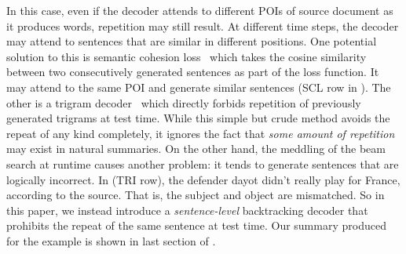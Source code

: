 In this case, even if the decoder attends to different POIs of 
source document as it produces words, repetition may still result.  
At different time steps, 
the decoder may attend 
to sentences that are similar in different positions.
One potential solution to this is semantic cohesion loss~\cite{elikyilmazBHC18}
which takes the cosine similarity between two consecutively generated sentences
as part of the loss function. It may attend to the same POI
and generate similar sentences (SCL row in ).  
The other is a trigram decoder~\cite{PaulusXS17} 
which directly forbids repetition of previously generated trigrams at test time. 
While this simple but crude method avoids the repeat of any kind
completely, 
it ignores the fact that \textit{some amount of repetition} may exist
in natural summaries.  
On the other hand, the meddling of the beam search at runtime causes another problem: 
it tends to generate sentences that are logically incorrect. 
In  (TRI row), the defender dayot didn't
really play for France, according to the source.
That is, the subject and object are mismatched.
So in this paper, we instead introduce a {\em sentence-level} backtracking decoder
that prohibits the repeat of the same sentence at test time.
Our summary produced for the example is shown in last section of 
.

%

